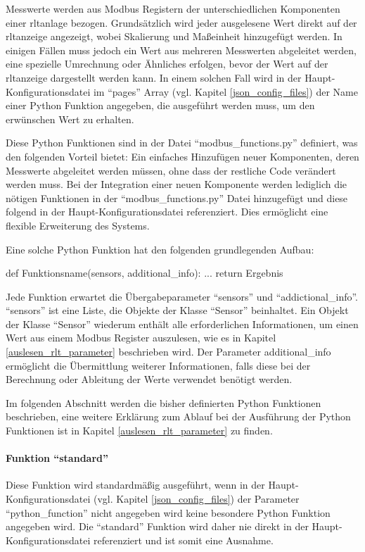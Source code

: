 \label{python_functions}

Messwerte werden aus Modbus Registern der unterschiedlichen Komponenten einer \acs{rltanlage} bezogen.  Grundsätzlich wird jeder ausgelesene Wert direkt auf der \acs{rltanzeige} angezeigt, wobei Skalierung und Maßeinheit hinzugefügt werden. In einigen Fällen muss jedoch ein Wert aus mehreren Messwerten abgeleitet werden, eine spezielle Umrechnung oder Ähnliches erfolgen, bevor der Wert auf der \acs{rltanzeige} dargestellt werden kann. In einem solchen Fall wird in der Haupt-Konfigurationsdatei im \enquote{pages} Array (vgl. Kapitel \ref{json_config_files}) der Name einer Python Funktion angegeben, die ausgeführt werden muss, um den erwünschen Wert zu erhalten. 

Diese Python Funktionen sind in der Datei \enquote{modbus\_functions.py} definiert, was den folgenden Vorteil bietet: Ein einfaches Hinzufügen neuer Komponenten, deren Messwerte abgeleitet werden müssen, ohne dass der restliche Code verändert werden muss. Bei der Integration einer neuen Komponente werden lediglich die nötigen Funktionen in der \enquote{modbus\_functions.py} Datei hinzugefügt und diese folgend in der Haupt-Konfigurationsdatei referenziert. Dies ermöglicht eine flexible  Erweiterung des Systems.

Eine solche Python Funktion hat den folgenden grundlegenden Aufbau:
\begin{pythoncode}
def Funktionsname(sensors, additional_info):
	...	
	return Ergebnis
\end{pythoncode}

Jede Funktion erwartet die Übergabeparameter \enquote{sensors} und \enquote{addictional\_info}. \enquote{sensors} ist eine Liste, die Objekte der Klasse \enquote{Sensor} beinhaltet. Ein Objekt der Klasse \enquote{Sensor} wiederum enthält alle erforderlichen Informationen, um einen Wert aus einem Modbus Register auszulesen, wie es in Kapitel \ref{auslesen_rlt_parameter} beschrieben wird. \newline 
Der Parameter additional\_info ermöglicht die Übermittlung weiterer Informationen, falls diese bei der Berechnung oder Ableitung der Werte verwendet benötigt werden.

Im folgenden Abschnitt werden die bisher definierten Python Funktionen beschrieben, eine weitere Erklärung zum Ablauf bei der Ausführung der Python Funktionen ist in Kapitel \ref{auslesen_rlt_parameter} zu finden.


\paragraph{Funktion \enquote{standard}}
Diese Funktion wird standardmäßig ausgeführt, wenn in der Haupt-Konfigurationsdatei (vgl. Kapitel \ref{json_config_files}) der Parameter \enquote{python\_function} nicht angegeben wird \bzw keine besondere Python Funktion angegeben wird. Die \enquote{standard} Funktion wird daher nie direkt in der Haupt-Konfigurationsdatei referenziert und ist somit eine Ausnahme.

